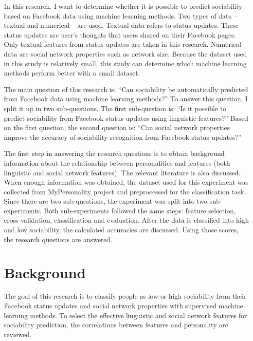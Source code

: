 \documentclass[
10pt, %
a4paper, %
oneside, %
headinclude,footinclude, %
] {book}%
\begin{document}
In this research, I want to determine whether it is possible to predict sociability based on Facebook data using machine learning methods. Two types of data – textual and numerical – are used. Textual data refers to status updates. These status updates are user’s thoughts that users shared on their Facebook pages. Only textual features from status updates are taken in this research. Numerical data are social network properties such as network size. Because the dataset used in this study is relatively small, this study can determine which machine learning methods perform better with a small dataset.

The main question of this research is: “Can sociability be automatically predicted from Facebook data using machine learning methods?” To answer this question, I split it up in two sub-questions. The first sub-question is: “Is it possible to predict sociability from Facebook status updates using linguistic features?” Based on the first question, the second question is: “Can social network properties improve the accuracy of sociability recognition from Facebook status updates?”

The first step in answering the research questions is to obtain background information about the relationship between personalities and features (both linguistic and social network features). The relevant literature is also discussed. When enough information was obtained, the dataset used for this experiment was collected from MyPersonality project \citep{celli2013workshop} and preprocessed for the classification task. Since there are two sub-questions, the experiment was split into two sub-experiments. Both sub-experiments followed the same steps: feature selection, cross validation, classification and evaluation. After the data is classified into high and low sociability, the calculated accuracies are discussed. Using those scores, the research questions are answered.





\chapter{Background}
The goal of this research is to classify people as low or high sociability from their Facebook status updates and social network properties with supervised machine learning methods. To select the effective linguistic and social network features for sociability prediction, the correlations between features and personality are reviewed.
\end{document}
